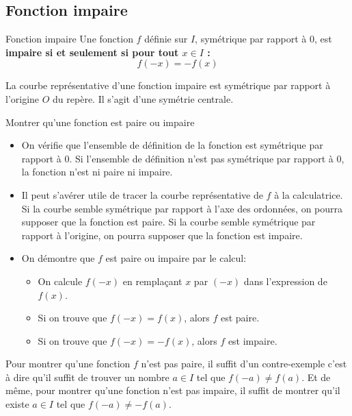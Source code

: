 \documentclass[10pt,a4paper,openany,twoside]{book}
\begin{document}
	\vspace{-2mm}
	\subsection{Fonction impaire}

	\vspace{-1mm}
	\begin{defi}{Fonction impaire}{}
		Une fonction $f$ définie sur $I$, symétrique par rapport à $0$, est \bf{impaire} si et seulement si pour tout $x \in I$ : $$f(-x)=-f(x)$$
	\end{defi}

	\begin{prop}{}{}
	La courbe représentative d'une fonction impaire est symétrique par rapport à l'origine $O$ du repère. Il s'agit d'une symétrie centrale.
	\end{prop}

	\begin{methode}{Montrer qu'une fonction est paire ou impaire}{}
		\begin{itemize}
		\item On vérifie que l'ensemble de définition de la fonction est symétrique par rapport à 0. Si l'ensemble de définition n'est pas symétrique par rapport à 0, la fonction n'est ni paire ni impaire.

		\item Il peut s'avérer utile de tracer la courbe représentative de $f$ à la calculatrice.
		Si la courbe semble symétrique par rapport à l'axe des ordonnées, on pourra supposer que la fonction est paire.
		Si la courbe semble symétrique par rapport à l'origine, on pourra supposer que la fonction est impaire.

		\item On démontre que $f$ est paire ou impaire par le calcul:
		\begin{itemize}
		\item On calcule $f\left(-x\right)$ en remplaçant $x$ par $\left(-x\right)$ dans l'expression de $f\left(x\right)$.
		\item Si on trouve que $f\left(-x\right)=f\left(x\right)$, alors $f$ est paire.
		\item Si on trouve que $f\left(-x\right)=-f\left(x\right)$, alors $f$ est impaire.
		\end{itemize}
		\end{itemize}
		\end{methode}

	\begin{rem}{}{}
		Pour montrer qu'une fonction $f$ n'est pas paire, il suffit d'un contre-exemple c'est à dire qu'il suffit de trouver un nombre $a\in I$ tel que $f\left(-a\right)\neq f\left(a\right)$.
		Et de même, pour montrer qu'une fonction n'est pas impaire, il suffit de montrer qu'il existe $a\in I$ tel que $f(-a)\neq -f(a)$.
	\end{rem}
\end{document}
